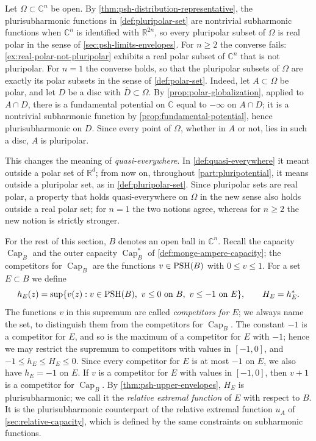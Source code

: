 Let $\Omega\subset\mathbb C^n$ be open. By \cref{thm:psh-distribution-representative}, the plurisubharmonic functions in \cref{def:pluripolar-set} are nontrivial subharmonic functions when $\mathbb C^n$ is identified with $\mathbb R^{2n}$, so every pluripolar subset of $\Omega$ is real polar in the sense of \cref{sec:psh-limits-envelopes}. For $n\ge2$ the converse fails: \cref{ex:real-polar-not-pluripolar} exhibits a real polar subset of $\mathbb C^n$ that is not pluripolar. For $n=1$ the converse holds, so that the pluripolar subsets of $\Omega$ are exactly its polar subsets in the sense of \cref{def:polar-set}. Indeed, let $A\subset\Omega$ be polar, and let $D$ be a disc with $\overline D\subset\Omega$. By \cref{prop:polar-globalization}, applied to $A\cap D$, there is a fundamental potential on $\mathbb C$ equal to $-\infty$ on $A\cap D$; it is a nontrivial subharmonic function by \cref{prop:fundamental-potential}, hence plurisubharmonic on $D$. Since every point of $\Omega$, whether in $A$ or not, lies in such a disc, $A$ is pluripolar.

This changes the meaning of \emph{quasi-everywhere}. In \cref{def:quasi-everywhere} it meant outside a polar set of $\mathbb R^d$; from now on, throughout \cref{part:pluripotential}, it means outside a pluripolar set, as in \cref{def:pluripolar-set}. Since pluripolar sets are real polar, a property that holds quasi-everywhere on $\Omega$ in the new sense also holds outside a real polar set; for $n=1$ the two notions agree, whereas for $n\ge2$ the new notion is strictly stronger.

For the rest of this section, $B$ denotes an open ball in $\mathbb C^n$. Recall the capacity $\operatorname{Cap}_B$ and the outer capacity $\operatorname{Cap}_B^*$ of \cref{def:monge-ampere-capacity}; the competitors for $\operatorname{Cap}_B$ are the functions $v\in\mathrm{PSH}(B)$ with $0\le v\le1$. For a set $E\subset B$ we define
\[
 h_E(z)=\sup\{v(z):v\in\PSH(B),\ v\le0\ \text{on }B,\ v\le-1\ \text{on }E\},
 \qquad H_E=h_E^*.
\]
The functions $v$ in this supremum are called \emph{competitors for $E$}; we always name the set, to distinguish them from the competitors for $\operatorname{Cap}_B$. The constant $-1$ is a competitor for $E$, and so is the maximum of a competitor for $E$ with $-1$; hence we may restrict the supremum to competitors with values in $[-1,0]$, and $-1\le h_E\le H_E\le0$. Since every competitor for $E$ is at most $-1$ on $E$, we also have $h_E=-1$ on $E$. If $v$ is a competitor for $E$ with values in $[-1,0]$, then $v+1$ is a competitor for $\operatorname{Cap}_B$. By \cref{thm:psh-upper-envelopes}, $H_E$ is plurisubharmonic; we call it the \emph{relative extremal function} of $E$ with respect to $B$. It is the plurisubharmonic counterpart of the relative extremal function $u_A$ of \cref{sec:relative-capacity}, which is defined by the same constraints on subharmonic functions.

